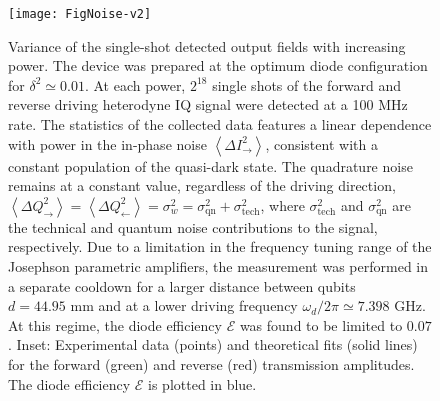 \documentclass[pra, twocolumn, amsmath, amssymb, notitlepage, longbibliography, showpacs, superscriptaddress]{revtex4-1}
\newcommand{\mean}[1]{\ensuremath{\left\langle #1\r\rangle}}
\renewcommand{\r}[0]{\right}
\begin{document}
\begin{figure}[t]
	\centering
  \texttt{[image: FigNoise-v2]}
  \caption{ Variance of the single-shot detected output fields with increasing power. 
  The device was prepared at the optimum diode configuration for $\delta^2 \simeq 0.01$.
  At each power, $2^{18}$ single shots of the forward and reverse driving 
  heterodyne IQ signal were detected at a 100 MHz rate. The statistics of the collected
  data features a linear dependence with power in the in-phase noise $\mean{\Delta I_\rightarrow^2}$,
  consistent with a constant population of the quasi-dark state. The quadrature noise
  remains at a constant value, regardless of the driving direction,
  $\mean{\Delta Q^2_\rightarrow} = \mean{\Delta Q^2_\leftarrow} = \sigma_w^2 = \sigma_\textrm{qn}^2 + \sigma_{\textrm{tech}}^2$,
  where $\sigma_{\textrm{tech}}^2$ and $\sigma_\textrm{qn}^2$ are the technical and quantum noise
  contributions to the signal, respectively.
  Due to a limitation in the frequency tuning range of the Josephson parametric amplifiers, the measurement was performed in 
  a separate cooldown for a larger distance between qubits $d=44.95\textrm{ mm}$ and 
  at a lower driving frequency $\omega_d/2\pi\simeq 7.398\textrm{ GHz}$.
  At this regime, the diode efficiency $\mathcal{E}$ was found to be limited to $0.07$. 
  Inset: Experimental data (points) and theoretical fits (solid lines) for the forward (green)
  and reverse (red) transmission amplitudes. The diode efficiency $\mathcal{E}$ is plotted in blue.}    
	\label{FigNoise}
\end{figure}
\end{document}
